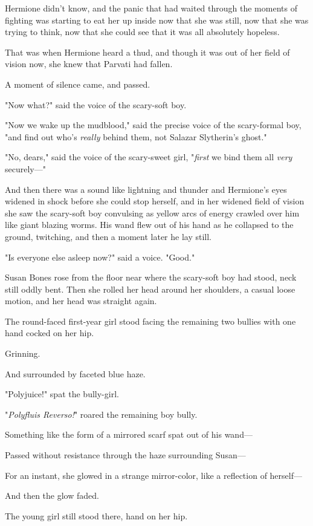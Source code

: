 Hermione didn't know, and the panic that had waited through the moments of 
fighting was starting to eat her up inside now that she was still, now that she 
was trying to think, now that she could see that it was all absolutely hopeless.

That was when Hermione heard a thud, and though it was out of her field of 
vision now, she knew that Parvati had fallen.

A moment of silence came, and passed.

"Now what?" said the voice of the scary-soft boy.

"Now we wake up the mudblood," said the precise voice of the scary-formal boy, 
"and find out who's \emph{really} behind them, not Salazar Slytherin's ghost."

"No, dears," said the voice of the scary-sweet girl, "\emph{first} we bind them 
all \emph{very} securely---"

And then there was a sound like lightning and thunder and Hermione's eyes 
widened in shock before she could stop herself, and in her widened field of 
vision she saw the scary-soft boy convulsing as yellow arcs of energy crawled 
over him like giant blazing worms. His wand flew out of his hand as he 
collapsed to the ground, twitching, and then a moment later he lay still.

"Is everyone else asleep now?" said a voice. "Good."

Susan Bones rose from the floor near where the scary-soft boy had stood, neck 
still oddly bent. Then she rolled her head around her shoulders, a casual loose 
motion, and her head was straight again.

The round-faced first-year girl stood facing the remaining two bullies with one 
hand cocked on her hip.

Grinning.

And surrounded by faceted blue haze.

"Polyjuice!" spat the bully-girl.

"\emph{Polyfluis Reverso!}" roared the remaining boy bully.

Something like the form of a mirrored scarf spat out of his wand---

Passed without resistance through the haze surrounding Susan---

For an instant, she glowed in a strange mirror-color, like a reflection of 
herself---

And then the glow faded.

The young girl still stood there, hand on her hip.

